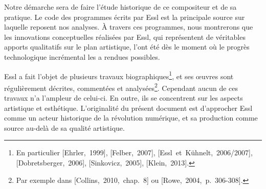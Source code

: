 \documentclass[a4paper,12pt]{article}
\newcommand{\guill}[1]{«~#1~»}
\newcommand{\zitat}[2]{\#Citation(#2)\#}
\newcommand{\cicite}[1]{{\footnotesize[#1]}}
\begin{document}
Notre démarche sera de faire l'étude historique de ce compositeur et de sa pratique. Le code des programmes écrits par Essl est la principale source sur laquelle reposent nos analyses. À travers ces programmes, nous montrerons que les innovations conceptuelles réalisées par Essl, qui représentent de véritables apports qualitatifs sur le plan artistique, l'ont été dès le moment où le progrès technologique incrémental les a rendues possibles.

Essl a fait l'objet de plusieurs travaux biographiques\footnote{En particulier \cicite{Ehrler,~1999}, \cicite{Felber,~2007}, \cicite{Essl~et~Kühnelt,~2006/2007}, \cicite{Dobretsberger,~2006}, \cicite{Sinkovicz,~2005}, \cicite{Klein,~2013}.}, et ses œuvres sont régulièrement décrites, commentées et analysées\footnote{Par exemple dans \cicite{Collins,~2010,~chap.~8} ou \cicite{Rowe,~2004,~p.~306-308}.}. Cependant aucun de ces travaux n'a l'ampleur de celui-ci. En outre, ils se concentrent sur les aspects artistique et esthétique. L'originalité du présent document est d'approcher Essl comme un acteur historique de la révolution numérique, et sa production comme source au-delà de sa qualité artistique.


\end{document}

